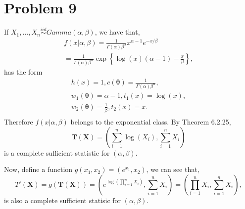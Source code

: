 \documentclass[letterpaper]{article}
\newcommand{\bX}{\mathbf{X}}
\newcommand{\TX}{\mathbf{T(X)}}
\begin{document}
    \section*{Problem 9}
    If $X_1, \dots, X_n \stackrel{iid}{\sim} Gamma(\alpha, \beta)$, we have that,
    \begin{eqnarray*}
    f(x|\alpha, \beta) = \frac{1}{\Gamma(\alpha)\beta^\alpha} x^{\alpha-1} e^{-x/\beta} \\
    = \frac{1}{\Gamma(\alpha)\beta^\alpha} \exp\left\{\log(x) (\alpha-1) - \frac{x}{\beta}\right\},
    \end{eqnarray*}
    has the form 
    \begin{eqnarray*}
    h(x) = 1, c(\boldsymbol{\theta}) = \frac{1}{\Gamma(\alpha) \beta^\alpha}, \\
    w_1(\boldsymbol{\theta}) = \alpha - 1, t_1(x) = \log(x), \\
    w_2(\boldsymbol{\theta}) = \frac{1}{\beta}, t_2(x) = x. \\
    \end{eqnarray*}
    Therefore $f(x|\alpha, \beta)$ belongs to the exponential class. By Theorem 6.2.25, 
    \[
    \TX = \left(\sum_{i=1}^n \log(X_i), \sum_{i=1}^n X_i \right)
    \]
    is a complete sufficient statistic for $(\alpha, \beta)$. 

    Now, define a function $g(x_1, x_2) = (e^{x_1}, x_2)$, we can see that,
    \[
    T'(\bX) = g(\TX) = \left( e^{\log\left(\prod_{i=1}^n X_i\right)}, \sum_{i=1}^n X_i \right) = \left(\prod_{i=1}^n X_i, \sum_{i=1}^n X_i \right),
    \]
    is also a complete sufficient statisic for $(\alpha, \beta)$.
\end{document}
